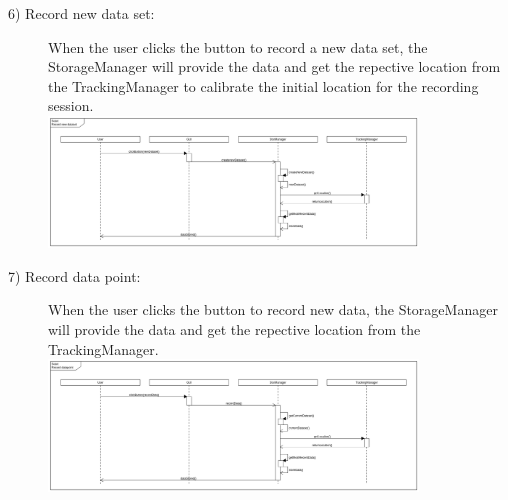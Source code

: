 \begin{description}
	\item[6) Record new data set: ] When the user clicks the button to record a new data set, the StorageManager will provide the data and get the repective location from the TrackingManager to calibrate the initial location for the recording session. \\
	\includegraphics[width=0.8\textwidth]{diagramms/newDataset.png}

	\item[7) Record data point: ] When the user clicks the button to record new data, the StorageManager will provide the data and get the repective location from the TrackingManager.\\
	\includegraphics[width=0.8\textwidth]{diagramms/recordDatapoint.png}



\end{description}
